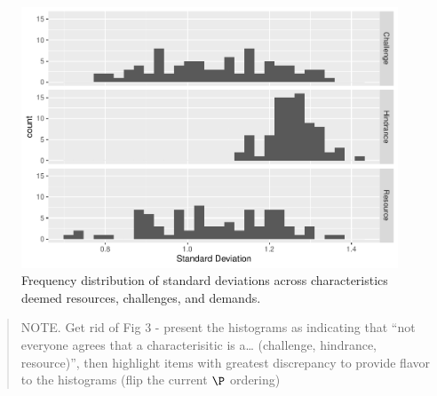 \documentclass[
  man]{apa7}
\begin{document}
\begin{figure}
\centering
\includegraphics{Submission_files/figure-latex/overallhist-1.pdf}
\caption{\label{fig:overallhist}Frequency distribution of standard deviations across characteristics deemed resources, challenges, and demands.}
\end{figure}

\begin{quote}
NOTE. Get rid of Fig 3 - present the histograms as indicating that ``not everyone agrees that a characterisitic is a\ldots{} (challenge, hindrance, resource)'', then highlight items with greatest discrepancy to provide flavor to the histograms (flip the current \(\P\) ordering)
\end{quote}
\end{document}

